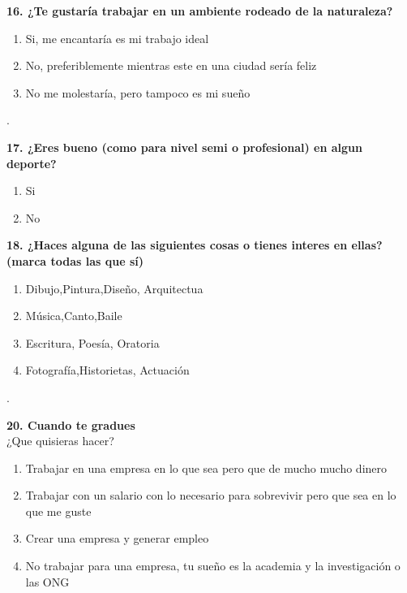 \documentclass{article}
\begin{document}
\textbf{16. ¿Te gustaría trabajar en un ambiente rodeado de la naturaleza?}
\begin{enumerate}[label=(\Alph*)]
\item Si, me encantaría es mi trabajo ideal
\item No, preferiblemente mientras este en una ciudad sería feliz
\item No me molestaría, pero tampoco es mi sueño
 \end{enumerate}. 


\textbf{17. ¿Eres bueno (como para nivel semi o profesional) en algun deporte?}
\begin{enumerate}[label=(\Alph*)]
\item Si
\item No 
\end{enumerate} 

\textbf{18. ¿Haces alguna de las siguientes cosas o tienes interes en ellas? (marca todas las que sí) } 
\begin{enumerate}[label=(\Alph*)]
\item Dibujo,Pintura,Diseño, Arquitectua
\item Música,Canto,Baile
\item Escritura, Poesía, Oratoria
\item Fotografía,Historietas, Actuación
\end{enumerate}.

\textbf{20. Cuando te gradues }\\
¿Que quisieras hacer?
\begin{enumerate}[label=(\Alph*)]
\item Trabajar en una empresa en lo que sea pero que de mucho mucho dinero
\item Trabajar con un salario con lo necesario para sobrevivir pero que sea en lo que me guste
\item Crear una empresa y generar empleo
\item No trabajar para una empresa, tu sueño es la academia y la investigación o las ONG 
 \end{enumerate}  
\end{document}

